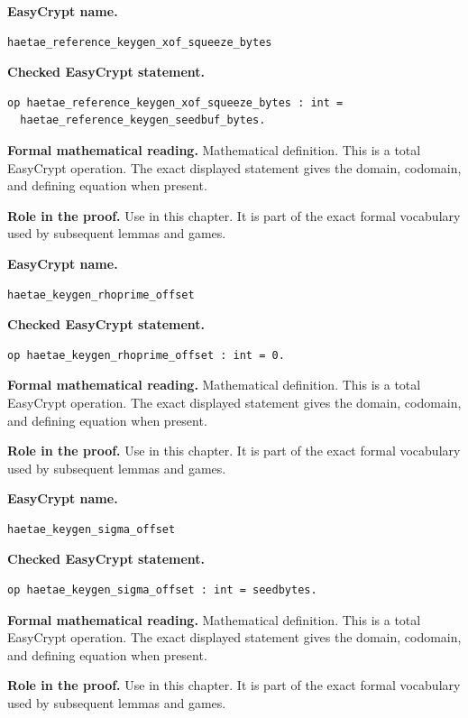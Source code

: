 \begin{formaldefinition}
\noindent\textbf{EasyCrypt name.}
\begin{lstlisting}[language=EasyCrypt,basicstyle=\ttfamily\scriptsize]
haetae_reference_keygen_xof_squeeze_bytes
\end{lstlisting}
\noindent\textbf{Checked EasyCrypt statement.}
\begin{lstlisting}[language=EasyCrypt,basicstyle=\ttfamily\scriptsize]
op haetae_reference_keygen_xof_squeeze_bytes : int =
  haetae_reference_keygen_seedbuf_bytes.
\end{lstlisting}
\noindent\textbf{Formal mathematical reading.}
Mathematical definition. This is a total EasyCrypt operation.  The exact displayed statement gives the domain, codomain, and defining equation when present.

\noindent\textbf{Role in the proof.}
Use in this chapter. It is part of the exact formal vocabulary used by subsequent lemmas and games.

\end{formaldefinition}

\begin{formaldefinition}
\noindent\textbf{EasyCrypt name.}
\begin{lstlisting}[language=EasyCrypt,basicstyle=\ttfamily\scriptsize]
haetae_keygen_rhoprime_offset
\end{lstlisting}
\noindent\textbf{Checked EasyCrypt statement.}
\begin{lstlisting}[language=EasyCrypt,basicstyle=\ttfamily\scriptsize]
op haetae_keygen_rhoprime_offset : int = 0.
\end{lstlisting}
\noindent\textbf{Formal mathematical reading.}
Mathematical definition. This is a total EasyCrypt operation.  The exact displayed statement gives the domain, codomain, and defining equation when present.

\noindent\textbf{Role in the proof.}
Use in this chapter. It is part of the exact formal vocabulary used by subsequent lemmas and games.

\end{formaldefinition}

\begin{formaldefinition}
\noindent\textbf{EasyCrypt name.}
\begin{lstlisting}[language=EasyCrypt,basicstyle=\ttfamily\scriptsize]
haetae_keygen_sigma_offset
\end{lstlisting}
\noindent\textbf{Checked EasyCrypt statement.}
\begin{lstlisting}[language=EasyCrypt,basicstyle=\ttfamily\scriptsize]
op haetae_keygen_sigma_offset : int = seedbytes.
\end{lstlisting}
\noindent\textbf{Formal mathematical reading.}
Mathematical definition. This is a total EasyCrypt operation.  The exact displayed statement gives the domain, codomain, and defining equation when present.

\noindent\textbf{Role in the proof.}
Use in this chapter. It is part of the exact formal vocabulary used by subsequent lemmas and games.

\end{formaldefinition}

